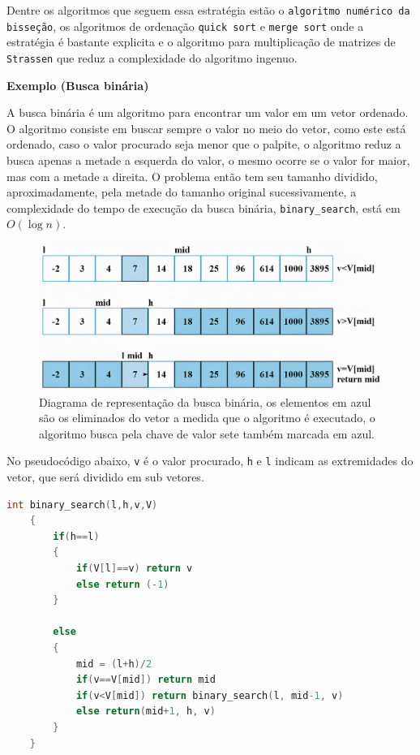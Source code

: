 Dentre os algoritmos que seguem essa estratégia estão o \texttt{algoritmo numérico da bisseção}, os algoritmos de ordenação \texttt{quick sort} e \texttt{merge sort} onde a estratégia é bastante explicita e o algoritmo para multiplicação de matrizes de \texttt{Strassen} que reduz a complexidade do algoritmo ingenuo.

\textbf{Exemplo (Busca binária)}

A busca binária é um algoritmo para encontrar um valor em um vetor ordenado. O algoritmo consiste em buscar sempre o valor no meio do vetor, como este está ordenado, caso o valor procurado seja menor que o palpite, o algoritmo reduz a busca apenas a metade a esquerda do valor, o mesmo ocorre se o valor for maior, mas com a metade a direita. O problema então tem seu tamanho dividido, aproximadamente, pela metade do tamanho original sucessivamente, a complexidade do tempo de execução da busca binária, \texttt{binary\_search}, está em $O(\log n)$.

\begin{figure}[h]
  \centering
  \includegraphics[width=1\linewidth]{img/binary_search.jpg}
    \caption{Diagrama de representação da busca binária, os elementos em azul são os eliminados do vetor a medida que o algoritmo é executado, o algoritmo busca pela chave de valor sete também marcada em azul.}
    \label{binary_search}
\end{figure}

\newpage

No pseudocódigo abaixo, \texttt{v} é o valor procurado, \texttt{h} e \texttt{l} indicam as extremidades do vetor, que será dividido em sub vetores.

\begin{lstlisting}[language=C, frame=single]
    int binary_search(l,h,v,V)
    {
        if(h==l)
        {
            if(V[l]==v) return v
            else return (-1)
        }
        
        else
        {
            mid = (l+h)/2
            if(v==V[mid]) return mid
            if(v<V[mid]) return binary_search(l, mid-1, v)
            else return(mid+1, h, v)
        }
    }
\end{lstlisting}

